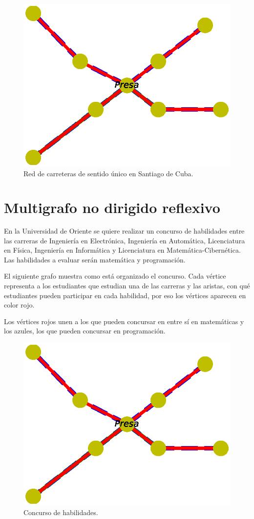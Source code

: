 \documentclass{article}
\begin{document}

\begin{figure}
  \includegraphics[width=.8\columnwidth]{8.eps}
  \caption{Red de carreteras de sentido único en Santiago de Cuba.}
  \label{fig:8}
\end{figure}

\section{Multigrafo no dirigido reflexivo}

En la Universidad de Oriente se quiere realizar un concurso de habilidades entre las carreras de Ingeniería en Electrónica, Ingeniería en Automática, Licenciatura en Física, Ingeniería en Informática y Licenciatura en Matemática-Cibernética. Las habilidades a evaluar serán matemática y programación. 

El siguiente grafo muestra como está organizado el concurso. Cada vértice representa a los estudiantes que estudian una de las carreras y las aristas, con qué estudiantes pueden participar en cada habilidad, por eso los vértices aparecen en color rojo.

Los vértices rojos unen a los que pueden concursar en entre sí en matemáticas y los azules, los que pueden concursar en programación.


\begin{figure}
  \includegraphics[width=.8\columnwidth]{8.eps}
  \caption{Concurso de habilidades.}
  \label{fig:9}
\end{figure}
\end{document}
